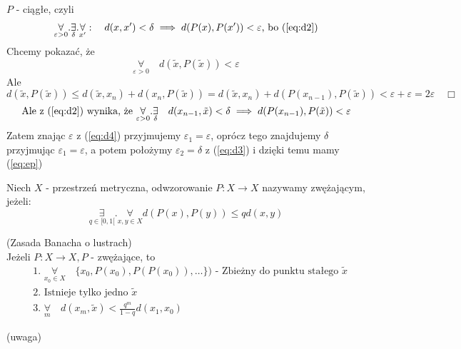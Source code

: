 \documentclass[../main.tex]{subfiles}
\begin{document}
$P$ - ciągłe, czyli
$$\underset{\varepsilon>0}{\forall}.\underset{\delta}{\exists}.\underset{x'}{\forall}:\quad d(x,x')<\delta \implies d(P(x),P(x'))<\varepsilon \text{, bo (\ref{eq:d2})}$$
Chcemy pokazać, że
\begin{equation}\label{eq:d4}
    \underset{\varepsilon>0}{\forall}\quad d(\tilde x,P(\tilde x))<\varepsilon
\end{equation}
Ale
\begin{equation}\label{eq:ep}
    d(\tilde x, P(\tilde x)) \leq d(\tilde x,x_n) + d(x_n, P(\tilde x)) = d(\tilde x, x_n) + d(P(x_{n-1}),P(\tilde x)) < \varepsilon + \varepsilon = 2 \varepsilon \quad \Box
\end{equation}
\begin{equation}
    \text{Ale z (\ref{eq:d2}) wynika, że }
    \underset{\varepsilon>0}{\forall}.\underset{\delta}{\exists}\quad d(x_{n-1},\tilde x) < \delta \implies d(P(x_{n-1}),P(\tilde x)) < \varepsilon
\end{equation}
Zatem znając $\varepsilon$ z (\ref{eq:d4}) przyjmujemy $\varepsilon_1 = \varepsilon$, oprócz tego znajdujemy $\delta$ przyjmując $\varepsilon_1 = \varepsilon$, a potem położymy $\varepsilon_2 = \delta$ z (\ref{eq:d3}) i dzięki temu mamy (\ref{eq:ep})

\vspace{1cm}

Niech $X$ - przestrzeń metryczna, odwzorowanie $P: X\to X$ nazywamy zwężającym, jeżeli:
\begin{equation}\label{eq:zwezajace}
    \underset{q\in [0,1[}{\exists}.\underset{x,y\in X}{\forall} d(P(x),P(y)) \leq q d(x,y)
\end{equation}

\begin{tw}
    (Zasada Banacha o lustrach)\\
    Jeżeli $P: X \to X, P$ - zwężające, to
    \begin{align}\label{eq:banach}
        &\text{1. } \underset{x_0 \in X}{\forall}\quad \{x_0,P(x_0),P(P(x_0)),\dots\}) \text{ - Zbieżny do punktu stałego } \tilde x\\
        &\text{2. Istnieje tylko jedno }\tilde x\\
        &\text{3. } \underset{m}{\forall}\quad d(x_m,\tilde x) < \frac{q^m}{1-q} d(x_1, x_0)
    \end{align}
\end{tw}


\begin{przyklad}
    (uwaga)
\end{przyklad}
\end{document}
